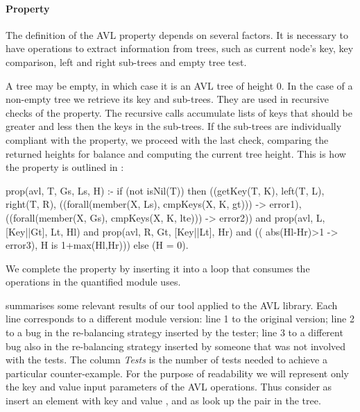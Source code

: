 

\paragraph{\bf Property}


The definition of the AVL property depends on several factors.
%
It is necessary to have operations to extract information from trees,
such as current node's key, key comparison, left and
right sub-trees and empty tree test.


A tree may be empty, in which case it is an AVL tree of height 0.
%
In the case of a non-empty tree we retrieve its key and sub-trees.
%
They are used in recursive checks of the property.
%
The recursive calls accumulate lists of keys that should be greater and
less then the keys in the sub-trees.
%
If the sub-trees are individually compliant with the property, we
proceed with the last check, comparing the returned heights for
balance and computing the current tree height.
%
This is how the property is outlined in \plqc{}:
%

\begin{yapcode}
prop({avl, T, Gs, Ls, H}) :- if (not isNil(T)) then
 ((getKey(T, K), left(T, L),  right(T, R),
      ((forall(member(X, Ls), cmpKeys(X, K, gt))) -> error1),
      ((forall(member(X, Gs), cmpKeys(X, K, lte))) -> error2))
   and prop({avl, L, [Key||Gt], Lt, Hl})
   and prop({avl, R, Gt, [Key||Lt], Hr})
   and (( abs(Hl-Hr)>1 -> error3), H is 1+max(Hl,Hr)))
 else (H = 0).
\end{yapcode}
%
We complete the property by inserting it into a loop that consumes the
operations in the quantified module uses.



 summarises some relevant results of our tool
applied to the AVL library.
%
Each line corresponds to a different module version: line 1 to the
original version; line 2 to a bug in the re-balancing strategy inserted
by the tester; line 3 to a different bug also in the re-balancing
strategy inserted by someone that was not involved with the tests.
%
The column \emph{Tests} is the number of tests needed to achieve a
particular counter-example.
%
For the purpose of readability we will represent only the key and value
input parameters of the AVL operations.
%
Thus consider  as insert an
element with key  and value  , and  as look up
the pair  in the tree.


